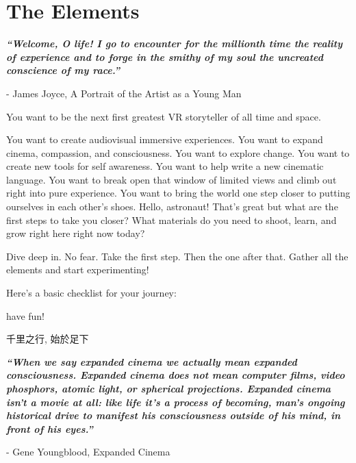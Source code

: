 \section{The Elements}
\pagecolor{white}
\label{chap:1}
\begin{fullwidth}

{\itshape\bfseries “Welcome, O life! I go to encounter for the millionth time the reality of experience and to forge in the smithy of my soul the uncreated conscience of my race.”}

- James Joyce, A Portrait of the Artist as a Young Man
\vspace{\baselineskip}

\problem

{\large You want to be the next first greatest VR storyteller of all time and space. \par}

You want to create audiovisual immersive experiences. You want to expand cinema, compassion, and consciousness. You want to explore change. You want to create new tools for self awareness. You want to help write a new cinematic language. You want to break open that window of limited views and climb out right into pure experience. You want to bring the world one step closer to putting ourselves in each other’s shoes. Hello, astronaut! That’s great but what are the first steps to take you closer? What materials do you need to shoot, learn, and grow right here right now today?

\solution

{\large Dive deep in. No fear. Take the first step. Then the one after that. Gather all the elements and start experimenting! \par}

Here’s a basic checklist for your journey:
\clearpage
{}




have fun!

\begin{CJK*}{UTF8}{gbsn}
千里之行, 始於足下
\clearpage\end{CJK*}

{\itshape\bfseries “When we say expanded cinema we actually mean expanded consciousness. Expanded cinema does not mean computer films, video phosphors, atomic light, or spherical projections. Expanded cinema isn't a movie at all: like life it's a process of becoming, man's ongoing historical drive to manifest his consciousness outside of his mind, in front of his eyes.”}

- Gene Youngblood, Expanded Cinema
\vspace{\baselineskip}

\clearpage
\end{fullwidth}
